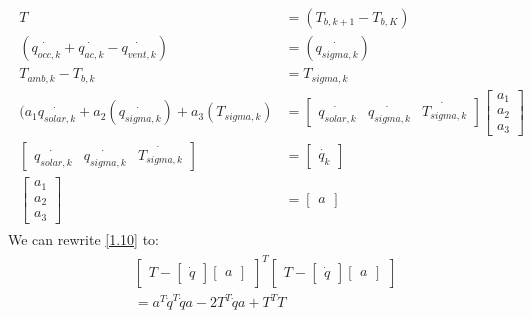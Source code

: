 \documentclass[titlepage,a4paper]{article}
\begin{document}
        \begin{align}
        \begin{split}
            T &= (T_{b,k+1} - T_{b,K})\\
            (\dot{q_{occ,k}}+\dot{q_{ac,k}}-\dot{q_{vent,k}}) &= (\dot{q_{sigma,k}})\\
            T_{amb,k} - T_{b,k} &= T_{sigma,k}\\
            (a_1\dot{q_{solar,k}} + a_2(\dot{q_{sigma,k}}) + a_3(T_{sigma,k}) &= 
            \begin{bmatrix} \dot{q_{solar,k}}&\dot{q_{sigma,k}}&\dot{T_{sigma,k}} \end{bmatrix} 
            \begin{bmatrix} a_1\\a_2\\a_3 \end{bmatrix}\\
            \begin{bmatrix} \dot{q_{solar,k}}&\dot{q_{sigma,k}}&\dot{T_{sigma,k}} \end{bmatrix} &= 
            \begin{bmatrix} \dot{q_k} \end{bmatrix}\\
            \begin{bmatrix} a_1\\a_2\\a_3 \end{bmatrix} &= 
            \begin{bmatrix} a \end{bmatrix}
        \end{split}
        \end{align}
        We can rewrite \eqref{1.10} to:
        \begin{align}
        \begin{split}\label{1.11}
            &\begin{bmatrix}T - \begin{bmatrix} \dot{q} \end{bmatrix} \begin{bmatrix} a \end{bmatrix} \end{bmatrix}^T 
            \begin{bmatrix}T - \begin{bmatrix} \dot{q} \end{bmatrix} \begin{bmatrix} a \end{bmatrix} \end{bmatrix}\\
            &= a^T \dot{q}^T \dot{q} a - 2T^T\dot{q}a + T^TT
        \end{split}
        \end{align}
        
\end{document}
